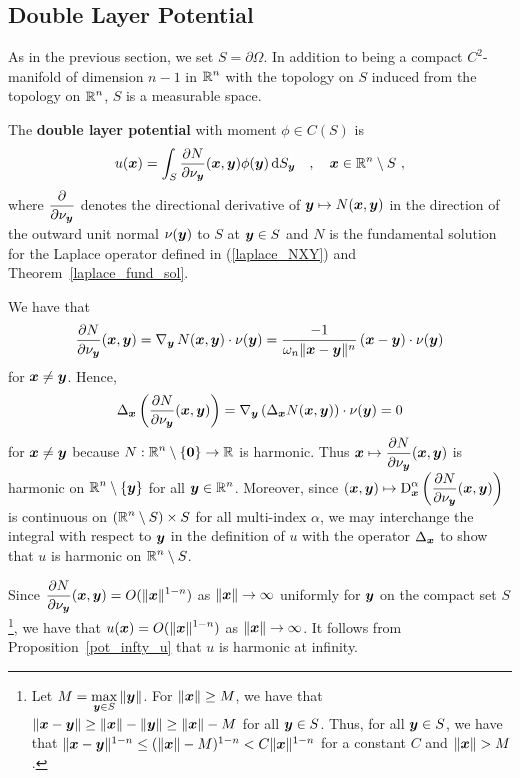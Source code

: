 \subsection{Double Layer Potential}

As in the previous section, we set $S = \partial \Omega$.  In addition
to being a compact $\displaystyle C^2$-manifold of dimension $n-1$ in
$\displaystyle \mathbb{R}^n$ with the topology on $S$ induced from the
topology on $\displaystyle \mathbb{R}^n$, $S$ is a measurable space.

\begin{defn} \label{pot_dblp_def}
The {\bfseries double layer potential} with moment $\phi \in C(S)$ is
\[
u({\bm{x}}) = \int_S
\frac{\partial{N}}{\partial \nu_{{\bm{y}}}}({\bm{x}},{\bm{y}}) \phi({\bm{y}}) \,\mathrm{d}{S}_{{\bm{y}}}
\quad , \quad {\bm{x}} \in \mathbb{R}^n \setminus S \ ,
\]
where $\displaystyle \frac{\partial{}}{\partial \nu_{{\bm{y}}}}$ denotes the
directional derivative of ${\bm{y}} \mapsto N({\bm{x}},{\bm{y}})$ in the
direction of the outward unit normal $\nu({\bm{y}})$ to
$S$ at ${\bm{y}} \in S$ and $N$ is the fundamental solution for
the Laplace operator defined in (\ref{laplace_NXY}) and
Theorem~\ref{laplace_fund_sol}.
\end{defn}

We have that
\[
\frac{\partial{N}}{\partial \nu_{{\bm{y}}}}({\bm{x}},{\bm{y}}) =
\operatorname{\nabla}_{{\bm{y}}} N({\bm{x}},{\bm{y}}) \cdot \nu({\bm{y}}) =
\frac{-1}{\omega_n \|{\bm{x}}-{\bm{y}}\|^n}\,({\bm{x}}-{\bm{y}})
\cdot \nu({\bm{y}})
\]
for ${\bm{x}} \neq {\bm{y}}$.  Hence,
\[
\Delta_{{\bm{x}}} \left(\frac{\partial{N}}{\partial \nu_{{\bm{y}}}}({\bm{x}},{\bm{y}})\right) =
\operatorname{\nabla}_{{\bm{y}}} \left( \Delta_{{\bm{x}}} N({\bm{x}},{\bm{y}}) \right) \cdot
\nu({\bm{y}}) = 0
\]
for ${\bm{x}} \neq {\bm{y}}$ because
$\displaystyle N:\mathbb{R}^n \setminus \{ {\bm{0}} \} \to \mathbb{R}$ is harmonic.
Thus
$\displaystyle {\bm{x}} \mapsto \frac{\partial{N}}{\partial \nu_{{\bm{y}}}}({\bm{x}},{\bm{y}})$
is harmonic on $\displaystyle \mathbb{R}^n\setminus \{{\bm{y}}\}$ for all
$\displaystyle {\bm{y}} \in \mathbb{R}^n$.  Moreover, since 
$\displaystyle ({\bm{x}},{\bm{y}}) \mapsto
\operatorname{D}^\alpha_{{\bm{x}}}
\left(\frac{\partial{N}}{\partial \nu_{{\bm{y}}}}({\bm{x}},{\bm{y}})\right)$
is continuous on $\displaystyle (\mathbb{R}^n\setminus S)\times S$ for all
multi-index $\alpha$, we may interchange the integral with respect to
${\bm{y}}$ in the definition of $u$ with the operator
$\Delta_{{\bm{x}}}$ to show that $u$ is harmonic on
$\displaystyle \mathbb{R}^n \setminus S$. 

Since
$\displaystyle 
\frac{\partial{N}}{\partial \nu_{{\bm{y}}}}({\bm{x}},{\bm{y}}) = O(\|{\bm{x}}\|^{1-n})$
as $\|{\bm{x}}\| \rightarrow \infty$ uniformly for ${\bm{y}}$ on the
compact set $S$ \footnote{
Let $\displaystyle M = \max_{{\bm{y}} \in S} \|{\bm{y}}\|$.
For $\|{\bm{x}}\| \geq M$, we have that
$\|{\bm{x}}-{\bm{y}}\| \geq \|{\bm{x}}\| - \|{\bm{y}}\| \geq \|{\bm{x}}\| - M$
for all ${\bm{y}} \in S$.  Thus, for all ${\bm{y}} \in S$,
we have that $\|{\bm{x}} - {\bm{y}}\|^{1-n}
\leq (\|{\bm{x}}\| - M)^{1-n} < C \|{\bm{x}}\|^{1-n}$ 
for a constant $C$ and $\|{\bm{x}}\| > M$.}, we have that
$\displaystyle u({\bm{x}}) = O(\|{\bm{x}}\|^{1-n})$
as $\|{\bm{x}}\| \rightarrow \infty$.
It follows from Proposition~\ref{pot_infty_u} that $u$ is harmonic at
infinity.

